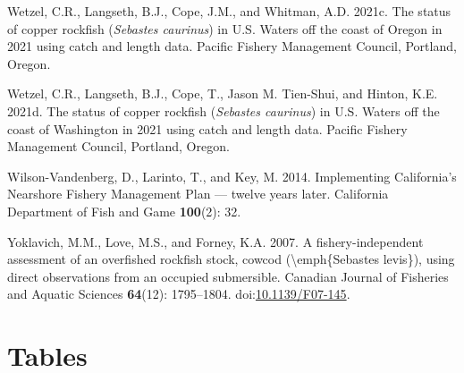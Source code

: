 \documentclass[11pt,
  english,
  letterpaper,
]{article}
\newlength{\cslhangindent}
\newenvironment{CSLReferences}[2] %
 {%
  \setlength{\parindent}{0pt}
  \ifodd #1 \everypar{\setlength{\hangindent}{\cslhangindent}}\ignorespaces\fi
  \ifnum #2 > 0
  \setlength{\parskip}{#2\baselineskip}
  \fi
 }%
 {}
\begin{document}
\begin{CSLReferences}{1}{0}
\leavevmode{}%
Wetzel, C.R., Langseth, B.J., Cope, J.M., and Whitman, A.D. 2021c. The status of copper rockfish (\emph{{Sebastes} caurinus}) in {U}.{S}. Waters off the coast of {Oregon} in 2021 using catch and length data. Pacific Fishery Management Council, Portland, Oregon.

\leavevmode{}%
Wetzel, C.R., Langseth, B.J., Cope, T., Jason M. Tien-Shui, and Hinton, K.E. 2021d. The status of copper rockfish (\emph{{Sebastes} caurinus}) in {U}.{S}. Waters off the coast of {Washington} in 2021 using catch and length data. Pacific Fishery Management Council, Portland, Oregon.

\leavevmode{}%
Wilson-Vandenberg, D., Larinto, T., and Key, M. 2014. Implementing {California}'s {Nearshore} {Fishery} {Management} {Plan} --- twelve years later. California Department of Fish and Game \textbf{100}(2): 32.

\leavevmode{}%
Yoklavich, M.M., Love, M.S., and Forney, K.A. 2007. A fishery-independent assessment of an overfished rockfish stock, cowcod ({\textbackslash{}}emph\{{Sebastes} levis\}), using direct observations from an occupied submersible. Canadian Journal of Fisheries and Aquatic Sciences \textbf{64}(12): 1795--1804. doi:\href{https://doi.org/10.1139/F07-145}{10.1139/F07-145}.

\end{CSLReferences}

\clearpage

\hypertarget{tables}{%
\section{Tables}\label{tables}}

\begingroup\fontsize{10}{12}\selectfont
\begingroup\fontsize{10}{12}\selectfont
\end{document}
